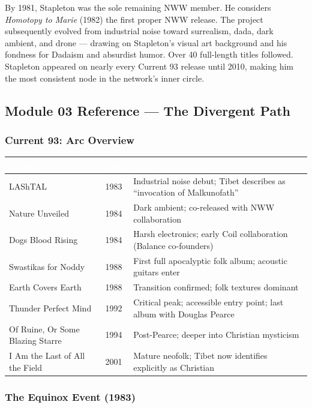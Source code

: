 \documentclass[11pt,letterpaper]{article}
\newcommand{\tableheader}[1]{\textbf{\sffamily\textcolor{white}{#1}}}
\begin{document}
By 1981, Stapleton was the sole remaining NWW member. He considers \textit{Homotopy to Marie}
(1982) the first proper NWW release. The project subsequently evolved from industrial noise
toward surrealism, dada, dark ambient, and drone — drawing on Stapleton's visual art background
and his fondness for Dadaism and absurdist humor. Over 40 full-length titles followed. Stapleton
appeared on nearly every Current 93 release until 2010, making him the most consistent node
in the network's inner circle.

\subsection{Module 03 Reference --- The Divergent Path}

\subsubsection{Current 93: Arc Overview}

\begin{center}
\begin{tabularx}{\textwidth}{L{3.5cm}L{2.5cm}X}
\toprule
{}
\tableheader{Album} & \tableheader{Year} & \tableheader{Era / Significance} \\
\midrule
LAShTAL & 1983 & Industrial noise debut; Tibet describes as ``invocation of Malkunofath'' \\
Nature Unveiled & 1984 & Dark ambient; co-released with NWW collaboration \\
Dogs Blood Rising & 1984 & Harsh electronics; early Coil collaboration (Balance co-founders) \\
Swastikas for Noddy & 1988 & First full apocalyptic folk album; acoustic guitars enter \\
Earth Covers Earth & 1988 & Transition confirmed; folk textures dominant \\
Thunder Perfect Mind & 1992 & Critical peak; accessible entry point; last album with Douglas Pearce \\
Of Ruine, Or Some Blazing Starre & 1994 & Post-Pearce; deeper into Christian mysticism \\
I Am the Last of All the Field & 2001 & Mature neofolk; Tibet now identifies explicitly as Christian \\
\bottomrule
\end{tabularx}
\end{center}

\subsubsection{The Equinox Event (1983)}
\end{document}
